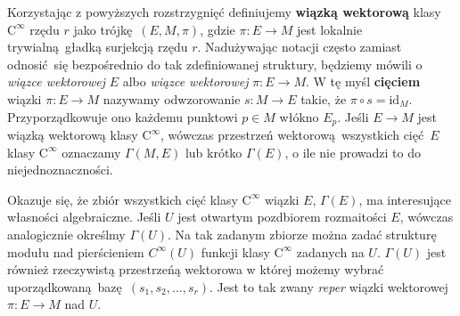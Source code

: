 Korzystając z powyższych rozstrzygnięć definiujemy \textbf{wiązką wektorową} klasy \(\mathrm{C}^\infty\) rzędu \(r\) jako trójkę \((E, M, \pi)\), gdzie \(\pi: E\to M\) jest lokalnie trywialną gładką surjekcją rzędu \(r\). Nadużywając notacji często zamiast odnosić się bezpośrednio do tak zdefiniowanej struktury, będziemy mówili o \emph{wiązce wektorowej} \(E\) albo \emph{wiązce wektorowej} \(\pi:E\to M\). W tę myśl \textbf{cięciem} wiązki \(\pi: E\to M\) nazywamy odwzorowanie \(s:M\to E\) takie, że \(\pi\circ s= \mathrm{id}_M\). Przyporządkowuje ono każdemu punktowi \(p\in M\) włókno \(E_p\). Jeśli \(E\to M\) jest wiązką wektorową klasy \(\mathrm{C}^\infty\), wówczas przestrzeń wektorową wszystkich cięć \(E\) klasy \(\mathrm{C}^\infty\) oznaczamy \(\Gamma(M, E)\) lub krótko \(\Gamma(E)\), o ile nie prowadzi to do niejednoznaczności. 

Okazuje się, że zbiór wszystkich cięć klasy \(\mathrm{C}^\infty\) wiązki \(E\), \(\Gamma(E)\), ma interesujące własności algebraiczne. Jeśli \(U\) jest otwartym pozdbiorem rozmaitości \(E\), wówczas analogicznie określmy \(\Gamma(U)\). Na tak zadanym zbiorze można zadać strukturę modułu nad pierścieniem \(C^\infty(U)\) funkcji klasy \(\mathrm{C}^\infty\) zadanych na \(U\). \(\Gamma(U)\) jest również rzeczywistą przestrzeńą wektorowa w której możemy wybrać uporządkowaną bazę \((s_1, s_2, \dots, s_r)\). Jest to tak zwany \emph{reper} wiązki wektorowej \(\pi:E\to M\) nad \(U\). 



